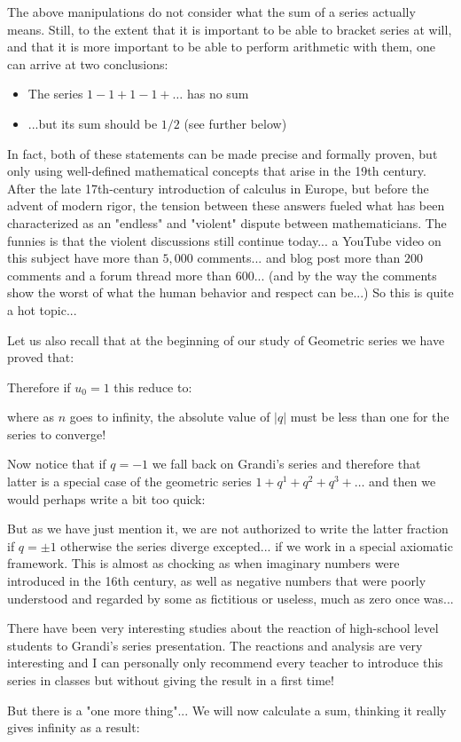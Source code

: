 	The above manipulations do not consider what the sum of a series actually means. Still, to the extent that it is important to be able to bracket series at will, and that it is more important to be able to perform arithmetic with them, one can arrive at two conclusions:
	\begin{itemize}
		\item The series $1-1 + 1-1 + \ldots$ has no sum

		\item ...but its sum should be $1/2$ (see further below)
	\end{itemize}
	In fact, both of these statements can be made precise and formally proven, but only using well-defined mathematical concepts that arise in the 19th century. After the late 17th-century introduction of calculus in Europe, but before the advent of modern rigor, the tension between these answers fueled what has been characterized as an "endless" and "violent" dispute between mathematicians. The funnies is that the violent discussions still continue today... a YouTube video on this subject have more than $5,000$ comments... and blog post more than $200$ comments and a forum thread more than $600$... (and by the way the comments show the worst of what the human behavior and respect can be...) So this is quite a hot topic...
	
	Let us also recall that at the beginning of our study of Geometric series we have proved that:
	
	Therefore if $u_0=1$ this reduce to:
		
	where as $n$ goes to infinity, the absolute value of $|q|$ must be less than one for the series to converge!

	Now notice that if $q=-1$ we fall back on Grandi's series and therefore that latter is a special case of the geometric series $1+q^1+q^2+q^3+\ldots$ and then we would perhaps write a bit too quick:
	
	But as we have just mention it, we are not authorized to write the latter fraction if $q=\pm 1$ otherwise the series diverge excepted... if we work in a special axiomatic framework. This is almost as chocking as when imaginary numbers were introduced in the 16th century, as well as negative numbers that were poorly understood and regarded by some as fictitious or useless, much as zero once was...
	\begin{tcolorbox}[title=Remark,colframe=black,arc=10pt]
	There have been very interesting studies about the reaction of high-school level students to Grandi's series presentation. The reactions and analysis are very interesting and I can personally only recommend every teacher to introduce this series in classes but without giving the result in a first time!
	\end{tcolorbox}
	But there is a "one more thing"... We will now calculate a sum, thinking it really gives infinity as a result:
	
